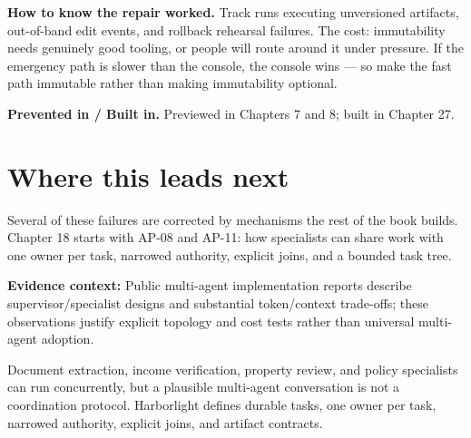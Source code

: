 \textbf{How to know the repair worked.} Track runs executing unversioned artifacts, out-of-band edit events, and rollback rehearsal failures. The cost: immutability needs genuinely good tooling, or people will route around it under pressure. If the emergency path is slower than the console, the console wins — so make the fast path immutable rather than making immutability optional.\par

\textbf{Prevented in / Built in.} Previewed in Chapters 7 and 8; built in Chapter 27.\par

\section{Where this leads next}

Several of these failures are corrected by mechanisms the rest of the book builds. Chapter 18 starts with AP-08 and AP-11: how specialists can share work with one owner per task, narrowed authority, explicit joins, and a bounded task tree.\par




\begin{bookquote}

\textbf{Evidence context:} Public multi-agent implementation reports describe supervisor/specialist designs and substantial token/context trade-offs; these observations justify explicit topology and cost tests rather than universal multi-agent adoption. \textbf{}

\end{bookquote}

\begin{bookcallout}
Document extraction, income verification, property review, and policy specialists can run concurrently, but a plausible multi-agent conversation is not a coordination protocol. Harborlight defines durable tasks, one owner per task, narrowed authority, explicit joins, and artifact contracts.
\end{bookcallout}

